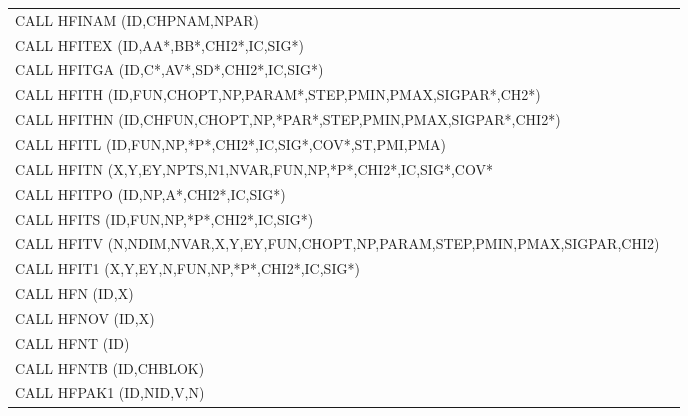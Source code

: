 \begin{longtable}{|>{\ttfamily\small}p{.9\linewidth}r|}
CALL     HFINAM (ID,CHPNAM,NPAR)
&                                                       \pageref{HFINAM} \\
CALL     HFITEX (ID,AA*,BB*,CHI2*,IC,SIG*)   
&                                                       \pageref{HFITEX} \\
CALL     HFITGA (ID,C*,AV*,SD*,CHI2*,IC,SIG*)
&                                                       \pageref{HFITGA} \\
CALL     HFITH  (ID,FUN,CHOPT,NP,PARAM*,STEP,PMIN,PMAX,SIGPAR*,CH2*)
&                                                       \pageref{HFITH}  \\
CALL     HFITHN (ID,CHFUN,CHOPT,NP,*PAR*,STEP,PMIN,PMAX,SIGPAR*,CHI2*)
&                                                       \pageref{HFITHN} \\
CALL     HFITL  (ID,FUN,NP,*P*,CHI2*,IC,SIG*,COV*,ST,PMI,PMA)
&                                                       \pageref{HFITL}  \\
CALL     HFITN  (X,Y,EY,NPTS,N1,NVAR,FUN,NP,*P*,CHI2*,IC,SIG*,COV*
&                                                       \pageref{HFITN}  \\
CALL     HFITPO (ID,NP,A*,CHI2*,IC,SIG*)     
&                                                       \pageref{HFITPO} \\
CALL     HFITS  (ID,FUN,NP,*P*,CHI2*,IC,SIG*)
&                                                       \pageref{HFITS}  \\
CALL     HFITV  (N,NDIM,NVAR,X,Y,EY,FUN,CHOPT,NP,PARAM,STEP,PMIN,PMAX,SIGPAR,CHI2)
&                                                       \pageref{HFITV}  \\
CALL     HFIT1  (X,Y,EY,N,FUN,NP,*P*,CHI2*,IC,SIG*)
&                                                       \pageref{HFIT1}  \\
CALL     HFN    (ID,X)                       
&                                                       \pageref{HFN}    \\
CALL     HFNOV  (ID,X)                       
&                                                       \pageref{HFNOV}  \\
CALL     HFNT   (ID)                         
&                                                       \pageref{HFNT}   \\
CALL     HFNTB  (ID,CHBLOK)                         
&                                                       \pageref{HFNTB}  \\
CALL     HFPAK1 (ID,NID,V,N)                 
&                                                       \pageref{HFPAK1} \\

\end{longtable}
